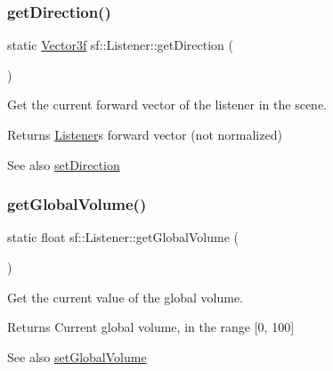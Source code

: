 \subsubsection{\texorpdfstring{getDirection()}{getDirection()}}
{\footnotesize\ttfamily static \mbox{\hyperlink{classsf_1_1_vector3}{Vector3f}} sf\+::\+Listener\+::get\+Direction (\begin{DoxyParamCaption}{ }\end{DoxyParamCaption})\hspace{0.3cm}{\ttfamily [static]}}



Get the current forward vector of the listener in the scene. 

\begin{DoxyReturn}{Returns}
\mbox{\hyperlink{classsf_1_1_listener}{Listener}}\textquotesingle{}s forward vector (not normalized)
\end{DoxyReturn}
\begin{DoxySeeAlso}{See also}
\mbox{\hyperlink{classsf_1_1_listener_ae479dc15513c6557984d26e32d06d06e}{set\+Direction}} \begin{DoxyVerb}\end{DoxyVerb}
 
\end{DoxySeeAlso}
\mbox{\label{classsf_1_1_listener_a137ea535799bdf70be6ec969673d4d33}} 
\subsubsection{\texorpdfstring{getGlobalVolume()}{getGlobalVolume()}}
{\footnotesize\ttfamily static float sf\+::\+Listener\+::get\+Global\+Volume (\begin{DoxyParamCaption}{ }\end{DoxyParamCaption})\hspace{0.3cm}{\ttfamily [static]}}



Get the current value of the global volume. 

\begin{DoxyReturn}{Returns}
Current global volume, in the range \mbox{[}0, 100\mbox{]}
\end{DoxyReturn}
\begin{DoxySeeAlso}{See also}
\mbox{\hyperlink{classsf_1_1_listener_a803a24a1fc04620cacc9f88c6fbc0e3a}{set\+Global\+Volume}} \begin{DoxyVerb}\end{DoxyVerb}
 
\end{DoxySeeAlso}
\mbox{\label{classsf_1_1_listener_acd7ee65bc948ca38e1c669aa12340c54}} 
